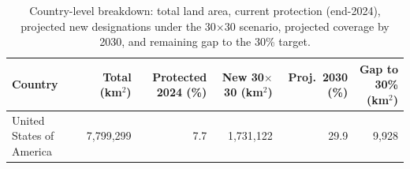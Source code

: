 \begin{table}[htbp]
  \centering
  \small
  \caption{Country-level breakdown: total land area, current protection (end-2024), projected new designations under the 30$\times$30 scenario, projected coverage by 2030, and remaining gap to the 30\% target.}
  \label{tab:forward_country}
  \begin{tabular}{lrrrrr}
    \toprule
    Country & Total (km$^2$) & Protected 2024 (\%) & New 30$\times$30 (km$^2$) & Proj.\ 2030 (\%) & Gap to 30\% (km$^2$) \\
    \midrule
    United States of America & 7,799,299 & 7.7 & 1,731,122 & 29.9 & 9,928 \\
    \bottomrule
  \end{tabular}
\end{table}
